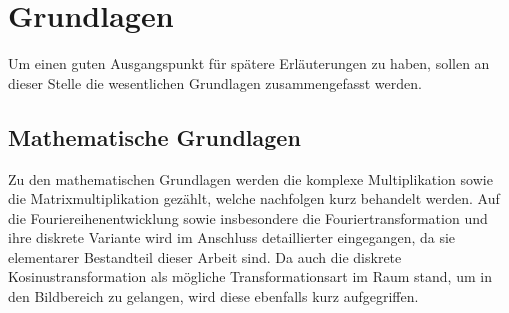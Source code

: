 



 
 
 
 \tableofcontents
 
 
 
 
 
 
 
 \chapter{Grundlagen}
 Um einen guten Ausgangspunkt für spätere Erläuterungen zu haben, sollen an dieser Stelle die wesentlichen Grundlagen zusammengefasst werden.
 
 \section{Mathematische Grundlagen}
 Zu den mathematischen Grundlagen werden die komplexe Multiplikation sowie die Matrixmultiplikation gezählt, welche nachfolgen kurz behandelt werden.
 Auf die Fouriereihenentwicklung sowie insbesondere die Fouriertransformation und ihre diskrete Variante wird im Anschluss detaillierter eingegangen, da
 sie elementarer Bestandteil dieser Arbeit sind.
 Da auch die diskrete Kosinustransformation als mögliche Transformationsart im Raum stand, um in den Bildbereich zu gelangen, wird diese ebenfalls kurz aufgegriffen.
 
 
 
  
 
 
  
 
 
 
 
 
 
